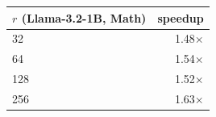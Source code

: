 \begin{tabular}{lr}
\toprule
$r$ (Llama-3.2-1B, Math) & speedup \\
\midrule
32 & 1.48$\times$ \\
64 & 1.54$\times$ \\
128 & 1.52$\times$ \\
256 & 1.63$\times$ \\
\bottomrule
\end{tabular}
